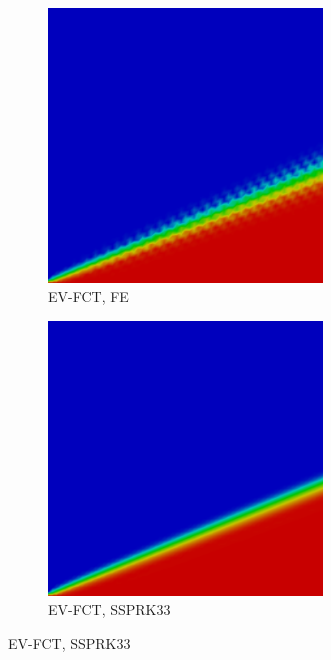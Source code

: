 \begin{frame}
\begin{figure}[h]
\begin{subfigure}{0.3\textwidth}
      \centering
      \includegraphics[width=0.8\textwidth]{./figures/glance_EVFCT_FE_cE01.png}
      \caption{EV-FCT, FE}
   \end{subfigure}
   \begin{subfigure}{0.3\textwidth}
      \centering
      \includegraphics[width=0.8\textwidth]{./figures/glance_EVFCT_SSP3_cE01.png}
      \caption{EV-FCT, SSPRK33}
   \end{subfigure}
\end{figure}

\end{frame}
